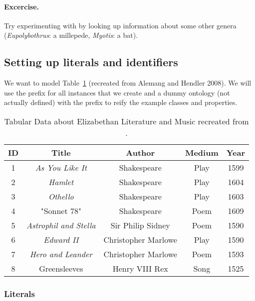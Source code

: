 \paragraph{Excercise.} Try experimenting with  by looking up information about some other genera (\emph{Eupolybothrus}: a millepede, \emph{Myotis}: a bat).

\subsection{Setting up literals and identifiers}

We want to model Table~\ref{table:classical-works} (recreated from Alemang and Hendler 2008). We will use the prefix  for all instances that we create and a dummy ontology (not actually defined) with the prefix  to reify the example classes and properties.

\begin{table}[h!]
\caption{Tabular Data about Elizabethan Literature and Music recreated from \cite{allemang_semantic_2011}.}
\begin{tabular}{ccccc}
\hline
 ID & Title                       & Author            & Medium & Year\\  \hline
 1  & \emph{As You Like It}       & Shakespeare       & Play & 1599\\
 2  & \emph{Hamlet}               & Shakespeare       & Play & 1604\\
 3  & \emph{Othello}              & Shakespeare       & Play & 1603\\
 4  & "Sonnet 78"                 & Shakespeare       & Poem & 1609\\
 5  & \emph{Astrophil and Stella} & Sir Philip Sidney & Poem & 1590\\
 6  & \emph{Edward II}            & Christopher Marlowe  & Play & 1590\\
 7  & \emph{Hero and Leander}     & Christopher Marlowe  & Poem & 1593\\
 8  & Greensleeves                & Henry VIII Rex       & Song & 1525
\end{tabular}
\label{table:classical-works}
\end{table}

\subsubsection{Literals}

